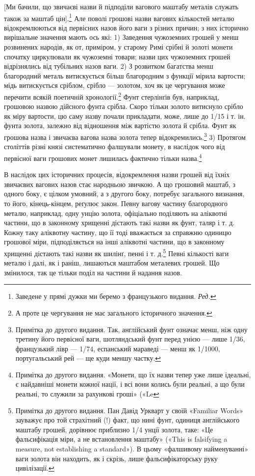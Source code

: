 [Ми бачили, що звичаєві назви й підподіли вагового маштабу
металів служать також за маштаб цін].\footnote*{
Заведене у прямі дужки ми беремо з французького видання. \emph{Ред.}
} Але поволі грошові
назви вагових кількостей металю відокремлюються від первісних
назов його ваги з різних причин; з них історично вирішальне
значення мають ось які: 1) Заведення чужоземних грошей у
менш розвинених народів, як от, приміром, у старому Римі
срібні й золоті монети спочатку циркулювали як чужоземні
товари; назви цих чужоземних грошей відрізнялись від тубільних
назов ваги. 2) З розвитком багатства менш благородний
металь витискується більш благородним з функції мірила вартости;
мідь витискується сріблом, срібло — золотом, хоч як це
чергування може перечити всякій поетичній хронології.\footnote{
А проте це чергування не має загального історичного значення.
} Фунт
стерлінґів був, наприклад, грошовою назвою дійсного фунта
срібла. Скоро тільки золото витиснуло срібло як міру вартости,
цю саму назву почали прикладати, може, лише до 1/15 і т. ін. фунта
золота, залежно від відношення між вартістю золота й
срібла. Фунт як грошова назва і звичаєва вагова назва золота
тепер відокремились.\footnote{
Примітка до другого видання. Так, англійський фунт означає
менш, ніж одну третину його первісної ваги, шотляндський фунт перед
унією — лише 1/36, французький лівр — 1/74, еспанський мараведі — менш
як 1/1000, португальський рей — ще куди меншу частку.
} 3) Протягом століттів різні князі систематично
фалшували монету, в наслідок чого від первісної ваги
грошових монет лишилась фактично тільки назва.\footnote{
Примітка до другого видання. «Монети, що їх назви тепер уже
лише ідеальні, є найдавніші монети кожної нації, і всі вони колись
були реальні, а що були реальні, то служили за рахункові гроші» («Le
}

В наслідок цих історичних процесів, відокремлення назви
грошей від їхніх звичаєвих вагових назов стає народньою звичкою.
А що грошовий маштаб, з одного боку, є цілком умовний,
а з другого боку, потребує загального визнання, то його, кінець-кінцем,
реґулює закон. Певну вагову частину благородного
металю, наприклад, одну унцію золота, офіціально поділяють
на аліквотні частини, що в законному хрищенні дістають
такі назви як фунт, таляр і т. д. Кожну таку аліквотну частину,
що її тоді вважається за справжню одиницю грошової міри, підподіляється
на інші аліквотні частини, що в законному хрищенні
дістають такі назви як шилінґ, пенні і т. д.\footnote{
Примітка до другого видання. Пан Давід Уркварт у своїй «Familiar
Words» зауважує про той страхітний (!) факт, що нині фунт, одиниця
англійського маштабу грошей, дорівнює приблизно 1/4 унції золота, таке:
«Це фальсифікація міри, а не встановлення маштабу» («This is falsifying
a measure, not establishing a standard»). В цьому «фалшивому
найменуванні» ваги золота він находить, як і скрізь, лише фальсифікаторську
руку цивілізації.
} Певні кількості ваги
металю і далі, як і раніш, лишаються маштабом металевих грошей.
Що змінилося, так це тільки поділ на частини й надання назов.

